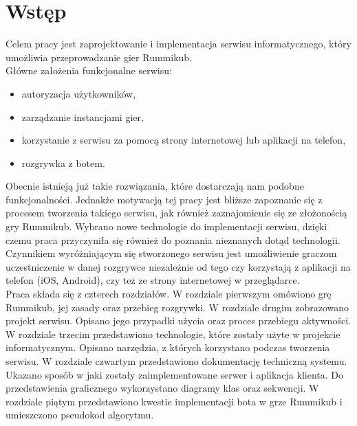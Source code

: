 \chapter*{Wstęp}

\thispagestyle{chapterBeginStyle}

Celem pracy jest zaprojektowanie i implementacja serwisu informatycznego, który umożliwia przeprowadzanie gier Rummikub.
\\

Główne założenia funkcjonalne serwisu:
	\begin{itemize}
		\item autoryzacja użytkowników,
		\item zarządzanie instancjami gier,
		\item korzystanie z serwisu za pomocą strony internetowej lub aplikacji na telefon,
		\item rozgrywka z botem. \\
	\end{itemize} 

Obecnie istnieją już takie rozwiązania, które dostarczają nam podobne funkcjonalności. Jednakże motywacją tej pracy jest bliższe zapoznanie się z procesem tworzenia takiego serwisu, jak również zaznajomienie się ze złożonością gry Rummikub. Wybrano nowe technologie do implementacji serwisu, dzięki czemu praca przyczyniła się również do poznania nieznanych dotąd technologii. Czynnikiem wyróżniającym się stworzonego serwisu jest umożliwienie graczom uczestniczenie w danej rozgrywce niezależnie od tego czy korzystają z aplikacji na telefon (iOS, Android), czy też ze strony internetowej w przeglądarce. \\

Praca składa się z czterech rozdziałów. W rozdziale pierwszym omówiono grę Rummikub, jej zasady oraz przebieg rozgrywki. W rozdziale drugim zobrazowano projekt serwisu. Opisano jego przypadki użycia oraz proces przebiegu aktywności.  W rozdziale trzecim przedstawiono technologie, które zostały użyte w projekcie informatycznym. Opisano narzędzia, z których korzystano podczas tworzenia serwisu. W rozdziale czwartym przedstawiono dokumentację techniczną systemu. Ukazano sposób w jaki zostały zaimplementowane serwer i aplikacja klienta. Do przedstawienia graficznego wykorzystano diagramy klas oraz sekwencji. W rozdziale piątym przedstawiono kwestie implementacji bota w grze Rummikub i umieszczono pseudokod algorytmu.